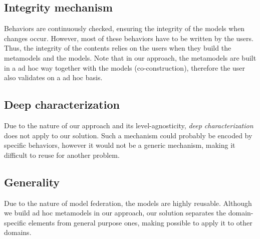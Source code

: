   \subsection{Integrity mechanism}


  Behaviors are continuously checked, ensuring the integrity of the models when
  changes occur. However, most of these behaviors have to be written by the
  users. Thus, the integrity of the contents relies on the users when they
  build the metamodels and the models.  Note that in our approach, the
  metamodels are built in a ad hoc way together with the models
  (co-construction), therefore the user also validates on a ad hoc basis.

  \subsection{Deep characterization}


  Due to the nature of our approach and its level-agnosticity, \emph{deep characterization} does not 
  apply to our solution. Such a mechanism could probably be encoded by specific behaviors, however 
  it would not be a generic mechanism, making it difficult to reuse for another problem.

  \subsection{Generality}


  Due to the nature of model federation, the models are highly reusable.
  Although we build ad hoc metamodels in our approach, our solution separates
  the domain-specific elements from general purpose ones, making possible to 
  apply it to other domains. 

